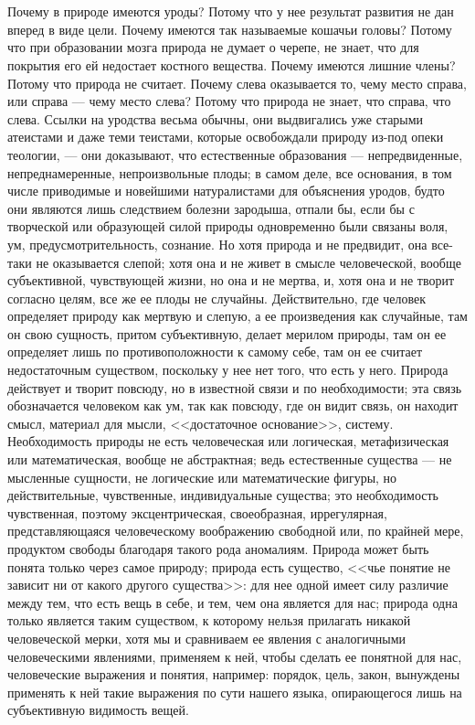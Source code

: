 \documentclass[12pt,oneside]{book}
\begin{document}
\chapter{}

Почему в природе имеются уроды? Потому что у нее результат развития не дан вперед в виде цели. Почему имеются так называемые кошачьи головы? Потому что при образовании мозга природа не думает о черепе, не знает, что для покрытия его ей недостает костного вещества. Почему имеются лишние члены? Потому что природа не считает. Почему слева оказывается то, чему место справа, или справа --- чему место слева? Потому что природа не знает, что справа, что слева. Ссылки на уродства весьма обычны, они выдвигались уже старыми атеистами и даже теми теистами, которые освобождали природу из-под опеки теологии, --- они доказывают, что естественные образования --- непредвиденные, непреднамеренные, непроизвольные плоды; в самом деле, все основания, в том числе приводимые и новейшими натуралистами для объяснения уродов, будто они являются лишь следствием болезни зародыша, отпали бы, если бы с творческой или образующей силой природы одновременно были связаны воля, ум, предусмотрительность, сознание. Но хотя природа и не предвидит, она все-таки не оказывается слепой; хотя она и не живет в смысле человеческой, вообще субъективной, чувствующей жизни, но она и не мертва, и, хотя она и не творит согласно целям, все же ее плоды не случайны. Действительно, где человек определяет природу как мертвую и слепую, а ее произведения как случайные, там он свою сущность, притом субъективную, делает мерилом природы, там он ее определяет лишь по противоположности к самому себе, там он ее считает недостаточным существом, поскольку у нее нет того, что есть у него. Природа действует и творит повсюду, но в известной связи и по необходимости; эта связь обозначается человеком как ум, так как повсюду, где он видит связь, он находит смысл, материал для мысли, <<достаточное основание>>, систему. Необходимость природы не есть человеческая или логическая, метафизическая или математическая, вообще не абстрактная; ведь естественные существа --- не мысленные сущности, не логические или математические фигуры, но действительные, чувственные, индивидуальные существа; это необходимость чувственная, поэтому эксцентрическая, своеобразная, иррегулярная, представляющаяся человеческому воображению свободной или, по крайней мере, продуктом свободы благодаря такого рода аномалиям. Природа может быть понята только через самое природу; природа есть существо, <<чье понятие не зависит ни от какого другого существа>>: для нее одной имеет силу различие между тем, что есть вещь в себе, и тем, чем она является для нас; природа одна только является таким существом, к которому нельзя прилагать никакой человеческой мерки, хотя мы и сравниваем ее явления с аналогичными человеческими явлениями, применяем к ней, чтобы сделать ее понятной для нас, человеческие выражения и понятия, например: порядок, цель, закон, вынуждены применять к ней такие выражения по сути нашего языка, опирающегося лишь на субъективную видимость вещей.
\end{document}
